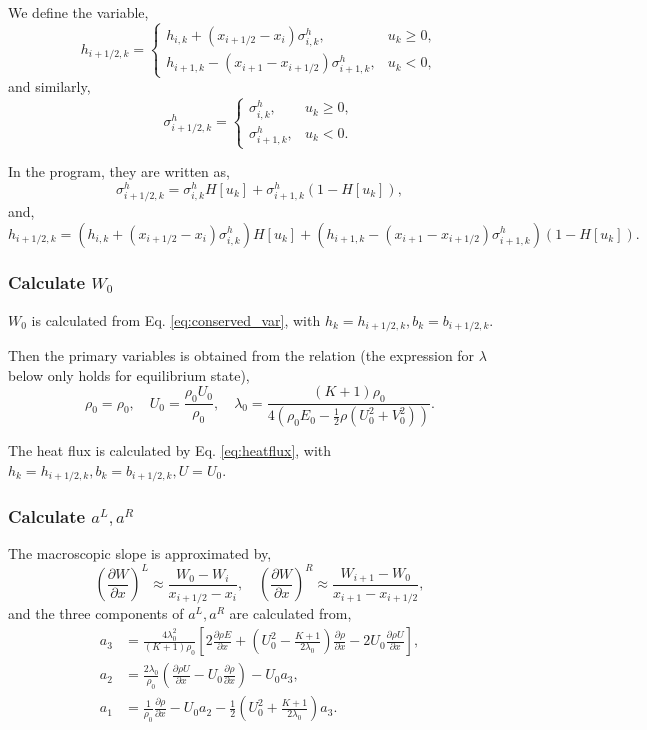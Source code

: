 \documentclass[a4paper]{book}
\begin{document}
We define the variable,
$$
h_{i+1/2,k} = 
\begin{cases} 
h_{i,k}+(x_{i+1/2}-x_i)\sigma_{i,k}^h, & u_k \geqslant 0,\\ 
h_{i+1,k}-(x_{i+1}-x_{i+1/2})\sigma_{i+1,k}^h, & u_k < 0,
\end{cases}
$$
and similarly,
$$
\sigma_{i+1/2,k}^h = 
\begin{cases} 
\sigma_{i,k}^h, & u_k \geqslant 0,\\ 
\sigma_{i+1,k}^h, & u_k < 0.
\end{cases}
$$

In the program, they are written as,
$$\sigma_{i+1/2,k}^h =\sigma_{i,k}^h H[u_k]+\sigma_{i+1,k}^h(1-H[u_k]),$$
and,
$$h_{i+1/2,k} = (h_{i,k}+(x_{i+1/2}-x_i)\sigma_{i,k}^h)H[u_k]+(h_{i+1,k}-(x_{i+1}-x_{i+1/2})\sigma_{i+1,k}^h)(1-H[u_k]).$$

\subsubsection*{Calculate $W_0$}
$W_0$ is calculated from Eq. \ref{eq:conserved_var}, with $h_k=h_{i+1/2,k}, b_k=b_{i+1/2,k}$.

Then the primary variables is obtained from the relation (the expression for $\lambda$ below only holds for equilibrium state),
$$\rho_0 = \rho_0,\quad U_0=\frac{\rho_0 U_0}{\rho_0},\quad \lambda_0=\frac{(K+1)\rho_0}{4\left(\rho_0 E_0-\frac{1}{2}\rho(U_0^2+V_0^2)\right)}.$$

The heat flux is calculated by Eq. \ref{eq:heatflux}, with $h_k=h_{i+1/2,k},b_k=b_{i+1/2,k},U=U_0$.

\subsubsection*{Calculate $a^L,a^R$}
The macroscopic slope is approximated by,
$$\left(\frac{\partial W}{\partial x}\right)^L\approx\frac{W_0-W_{i}}{x_{i+1/2}-x_i},\quad \left(\frac{\partial W}{\partial x}\right)^R\approx\frac{W_{i+1}-W_{0}}{x_{i+1}-x_{i+1/2}},$$
and the three components of $a^L,a^R$ are calculated from,
\begin{equation} 
    \label{eq:micro_slope}
    \begin{aligned}
        a_3&=\frac{4\lambda_0^2}{(K+1)\rho_0}\left[2\frac{\partial\rho E}{\partial x}+\left(U_0^2-\frac{K+1}{2\lambda_0}\right)\frac{\partial\rho}{\partial x}-2U_0\frac{\partial\rho U}{\partial x}\right],\\
        a_2&=\frac{2\lambda_0}{\rho_0}\left(\frac{\partial\rho U}{\partial x}-U_0\frac{\partial\rho}{\partial x}\right)-U_0a_3,\\
        a_1&=\frac{1}{\rho_0}\frac{\partial\rho}{\partial x}-U_0a_2-\frac{1}{2}\left(U_0^2+\frac{K+1}{2\lambda_0}\right)a_3.
    \end{aligned}
\end{equation}
\end{document}
